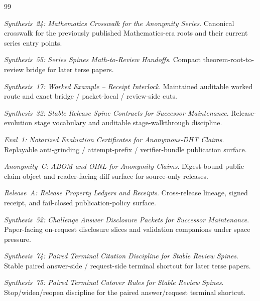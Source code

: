 \documentclass[11pt]{article}
\begin{document}
\begin{thebibliography}{99}\small

\textit{Synthesis~24: Mathematics Crosswalk for the Anonymity Series}.
Canonical crosswalk for the previously published Mathematics-era roots and their current series entry points.

\textit{Synthesis~55: Series Spines Math-to-Review Handoffs}.
Compact theorem-root-to-review bridge for later terse papers.

\textit{Synthesis~17: Worked Example -- Receipt Interlock}.
Maintained auditable worked route and exact bridge / packet-local / review-side cuts.

\textit{Synthesis~32: Stable Release Spine Contracts for Successor Maintenance}.
Release-evolution stage vocabulary and auditable stage-walkthrough discipline.

\textit{Eval~1: Notarized Evaluation Certificates for Anonymous-DHT Claims}.
Replayable anti-grinding / attempt-prefix / verifier-bundle publication surface.

\textit{Anonymity~C: ABOM and OINL for Anonymity Claims}.
Digest-bound public claim object and reader-facing diff surface for source-only releases.

\textit{Release~A: Release Property Ledgers and Receipts}.
Cross-release lineage, signed receipt, and fail-closed publication-policy surface.

\textit{Synthesis~52: Challenge Answer Disclosure Packets for Successor Maintenance}.
Paper-facing on-request disclosure slices and validation companions under space pressure.

\textit{Synthesis~74: Paired Terminal Citation Discipline for Stable Review Spines}.
Stable paired answer-side / request-side terminal shortcut for later terse papers.

\textit{Synthesis~75: Paired Terminal Cutover Rules for Stable Review Spines}.
Stop/widen/reopen discipline for the paired answer/request terminal shortcut.

\end{thebibliography}
\end{document}
